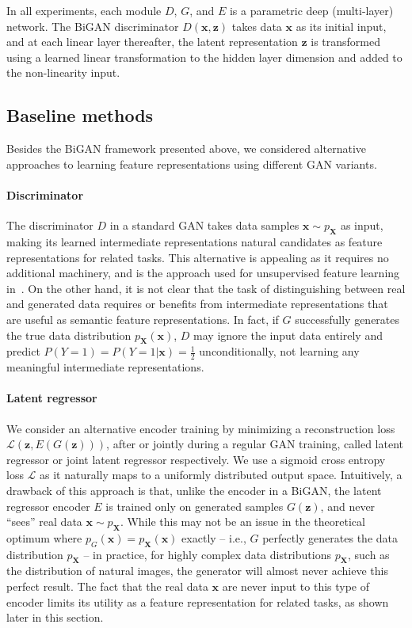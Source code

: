 \documentclass{article}
\renewcommand{\vec}[1]{\mathbf{#1}}
\newcommand{\x}{\vec{x}}
\newcommand{\X}{\vec{X}}
\newcommand{\z}{\vec{z}}
\newcommand{\lblsec}[1]{\label{sec:#1}}
\begin{document}
In all experiments, each module $D$, $G$, and $E$ is a parametric deep (multi-layer) network.
The BiGAN discriminator $D(\x, \z)$ takes data $\x$ as its initial input, and at each linear layer thereafter,
the latent representation $\z$ is transformed using a learned linear transformation to the hidden layer dimension and added to the non-linearity input.

\subsection{Baseline methods}
\lblsec{baselines}
Besides the BiGAN framework presented above,
we considered alternative approaches to learning feature representations using different GAN variants.

\paragraph{Discriminator}
The discriminator $D$ in a standard GAN takes data samples $\x \sim p_\X$ as input,
making its learned intermediate representations natural candidates as feature representations for related tasks.
This alternative is appealing as it requires no additional machinery,
and is the approach used for unsupervised feature learning in~\citet{dcgan}.
On the other hand, it is not clear that the task of distinguishing between real and generated data requires or benefits from intermediate representations that are useful as semantic feature representations.
In fact, if $G$ successfully generates the true data distribution $p_\X(\x)$,
$D$ may ignore the input data entirely and predict $P(Y=1)=P(Y=1|\x)=\frac{1}{2}$ unconditionally, not learning any meaningful intermediate representations.

\paragraph{Latent regressor}
\lblsec{baselineenc}
We consider an alternative encoder training by minimizing a reconstruction loss $
\mathcal{L}(\z, E(G(\z)))$, after or jointly during a regular GAN training, called latent regressor or joint latent regressor respectively.
We use a sigmoid cross entropy loss $\mathcal{L}$ as it naturally maps to a uniformly distributed output space.
Intuitively, a drawback of this approach is that,
unlike the encoder in a BiGAN,
the latent regressor encoder $E$ is trained only on generated samples $G(\z)$,
and never ``sees'' real data $\x \sim p_\X$.
While this may not be an issue in the theoretical optimum where $
p_G(\x)
=
p_\X(\x)
$ exactly
-- i.e., $G$ perfectly generates the data distribution $p_\X$ --
in practice, for highly complex data distributions $p_\X$,
such as the distribution of natural images,
the generator will almost never achieve this perfect result.
The fact that the real data $\x$ are never input to this type of encoder
limits its utility as a feature representation for related tasks, as shown later in this section.
\end{document}
